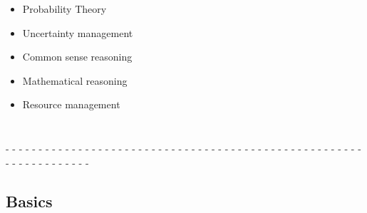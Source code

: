 \documentclass[aspectratio=169]{beamer}
\begin{document}
\begin{frame}
\begin{columns}
    \column{3in}
    \begin{itemize}
    \item Probability Theory
    \item Uncertainty management
    \item Common sense reasoning
    \item Mathematical reasoning
    \item Resource management
    \end{itemize}

  \end{columns}

  - - - - - - - - - - - - - - - - - - - - - - - - - - - - - - - - - -
  - - - - - - - - - - - - - - - - - - - - - - - - - - - - - - - - -\\[0.1cm]

\end{frame}

\subsection {Basics}
\end{document}
